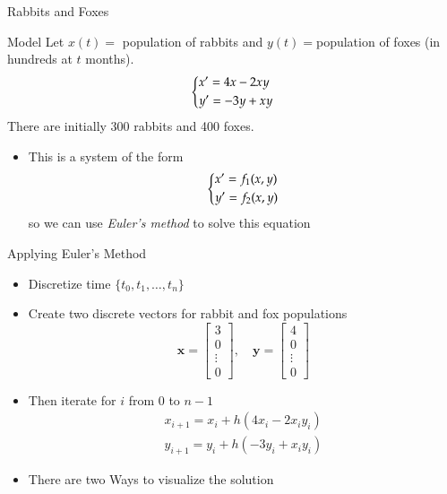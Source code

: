 \documentclass[10pt]{beamer}
\begin{document}
\begin{frame}{Rabbits and Foxes}
    \begin{block}{Model}
        Let $x(t)=$ population of rabbits and $y(t)=$population of foxes (in hundreds at $t$ months).
        $$
        \begin{dcases}
            x' = 4x -2xy\\
            y' = -3y + xy
        \end{dcases}
        $$
        There are initially 300 rabbits and 400 foxes.
    \end{block}
    \begin{itemize}
        \item This is a system of the form 
        $$
        \begin{dcases}
            x' =f_1(x,y)\\
            y' = f_2(x,y)
        \end{dcases}
        $$
        so we can use \textit{Euler's method} to solve this equation
    \end{itemize}
    
\end{frame}
\begin{frame}{Applying Euler's Method}
\begin{itemize}
    \item Discretize time $\{t_0,t_1,\dots,t_n\}$
    
    \item Create two discrete vectors for rabbit and fox populations
    $$
    \textbf{x} = \begin{bmatrix}
        3\\0\\\vdots\\0
    \end{bmatrix}, \quad \textbf{y} = \begin{bmatrix}
        4\\0\\\vdots\\0
    \end{bmatrix}
    $$
    \item Then iterate for $i$ from $0$ to $n-1$ 
    \begin{align*}    
    x_{i+1} = x_i+h( 4x_i-2x_iy_i)\\ 
    y_{i+1} =y_i+h(-3y_i+x_iy_i)
    \end{align*}

    \item There are two Ways to visualize the solution
\end{itemize}
\end{frame}
\end{document}
